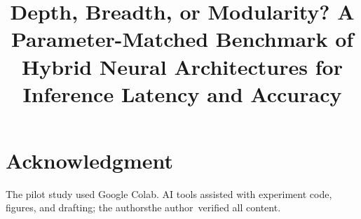 \documentclass[conference]{IEEEtran}
\begin{document}
\title{Depth, Breadth, or Modularity? A Parameter-Matched Benchmark of Hybrid Neural Architectures for
Inference Latency and Accuracy}

\ifanonymous
\author{
}
\else
\author{
}
\fi

\maketitle
\venuenotice










\section*{Acknowledgment}
The pilot study used Google Colab. AI tools assisted with experiment code, figures, and drafting;
\ifanonymous the authors\else the author\fi\ verified all content.



\end{document}
